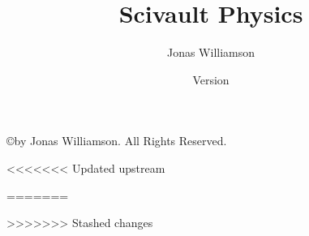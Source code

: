 \documentclass[12pt,openany]{book}
\newcommand{\mytitle}{Scivault Physics}
\begin{document}
	\frontmatter
	\title{\mytitle}
	\author{Jonas Williamson}
	\date{Version \the\year\the\month\the\day}
	\maketitle

\normalsize
	\copyright \space \the\year\space by Jonas Williamson.  All Rights Reserved. 
	
		\vspace{2 in}	


	\vspace{1 in}

	\tableofcontents


\mainmatter


	
	
	
	
	
	

	
	






	


		
		
	














\appendix

\appendixpage
\noappendicestocpagenum
\addappheadtotoc




		
	\backmatter	
<<<<<<< Updated upstream
	
	\printglossary
=======

>>>>>>> Stashed changes
\printindex		
\end{document}
